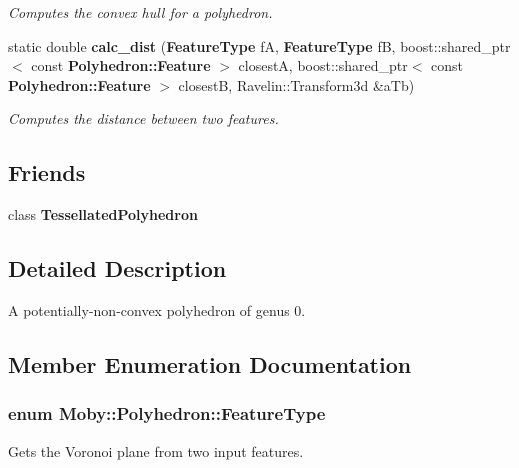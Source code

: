 \begin{DoxyCompactItemize}
\begin{DoxyCompactList}\small\item\em Computes the convex hull for a polyhedron. \end{DoxyCompactList}\item 
static double {\bf calc\-\_\-dist} ({\bf Feature\-Type} f\-A, {\bf Feature\-Type} f\-B, boost\-::shared\-\_\-ptr$<$ const {\bf Polyhedron\-::\-Feature} $>$ closest\-A, boost\-::shared\-\_\-ptr$<$ const {\bf Polyhedron\-::\-Feature} $>$ closest\-B, Ravelin\-::\-Transform3d \&a\-Tb)\label{classMoby_1_1Polyhedron_a7f6f47191dcb708b10f04c9cf1786ff7}

\begin{DoxyCompactList}\small\item\em Computes the distance between two features. \end{DoxyCompactList}\end{DoxyCompactItemize}
\subsection*{Friends}
\begin{DoxyCompactItemize}
\item 
class {\bfseries Tessellated\-Polyhedron}\label{classMoby_1_1Polyhedron_aa256fdce053f102562b540cceee239f1}

\end{DoxyCompactItemize}


\subsection{Detailed Description}
A potentially-\/non-\/convex polyhedron of genus 0. 

\subsection{Member Enumeration Documentation}
\subsubsection[{Feature\-Type}]{\setlength{\rightskip}{0pt plus 5cm}enum {\bf Moby\-::\-Polyhedron\-::\-Feature\-Type}}\label{classMoby_1_1Polyhedron_a9eeae159b2e4a6fbbfb0948dd0bbbfeb}


Gets the Voronoi plane from two input features. 

